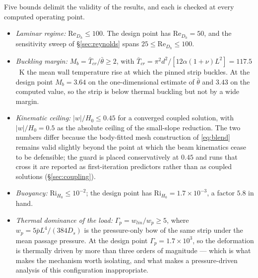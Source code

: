 \documentclass[11pt,a4paper]{article}
\newcommand{\Ga}{\Gamma}
\newcommand{\ReDh}{\mathrm{Re}_{D_h}}
\begin{document}
Five bounds delimit the validity of the results, and each is checked at every
computed operating point.
\begin{itemize}
\item[\textbf{B1}] \emph{Laminar regime:} $\ReDh\le100$. The design point has
$\ReDh=50$, and the sensitivity sweep of \S\ref{sec:reynolds} spans
$25\le\ReDh\le100$.
\item[\textbf{B2}] \emph{Buckling margin:} $M_b=\bar T_{cr}/\bar\theta\ge2$,
with $\bar T_{cr}=\pi^2d^2/[12\alpha(1+\nu)L^2]=117.5$~K the mean wall
temperature rise at which the pinned strip buckles. At the design point
$M_b=3.64$ on the one-dimensional estimate of $\bar\theta$ and $3.43$ on the
computed value, so the strip is below thermal buckling but not by a wide
margin.
\item[\textbf{B3}] \emph{Kinematic ceiling:} $|w|/H_0\le0.45$ for a
converged coupled solution, with $|w|/H_0=0.5$ as the absolute ceiling of the
small-slope reduction. The two numbers differ because the body-fitted mesh
construction of \eqref{eq:blend} remains valid slightly beyond the point at
which the beam kinematics cease to be defensible; the guard is placed
conservatively at $0.45$ and runs that cross it are reported as
first-iteration predictors rather than as coupled solutions
(\S\ref{sec:coupling}).
\item[\textbf{B4}] \emph{Buoyancy:} $\mathrm{Ri}_{H_0}\le10^{-2}$; the design
point has $\mathrm{Ri}_{H_0}=1.7\times10^{-3}$, a factor $5.8$ in hand.
\item[\textbf{B5}] \emph{Thermal dominance of the load:}
$\Ga_p=w_{lin}/w_p\ge5$, where $w_p=5\bar pL^4/(384D_s)$ is the pressure-only
bow of the same strip under the mean passage pressure. At the design point
$\Ga_p=1.7\times10^{3}$, so the deformation is thermally driven by more than
three orders of magnitude --- which is what makes the mechanism worth
isolating, and what makes a pressure-driven analysis of this configuration
inappropriate.
\end{itemize}

\end{document}
